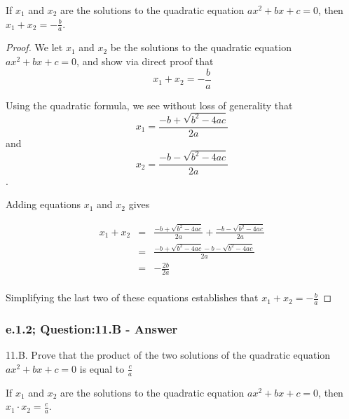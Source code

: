 \begin{tcolorbox}
\begin{theorem}
If $x_1$ and $x_2$ are the solutions to the quadratic equation $ax^2 + bx + c = 0$, then $x_1 + x_2 = - \frac{b}{a}$.
\end{theorem}
\end{tcolorbox}

\begin{proof}

We let $x_1$ and $x_2$ be the solutions to the quadratic equation $ax^2 + bx + c = 0$, and show via direct proof that \[ x_1 + x_2 = -\frac{b}{a} \]

Using the quadratic formula, we see without loss of generality that \[ x_1 = \frac{-b + \sqrt{b^2 -4ac}}{2a} \] and \[ x_2 = \frac{-b - \sqrt{b^2 -4ac}}{2a} \]. 

Adding equations $x_1$ and $x_2$ gives  

\begin{eqnarray*}
x_1 + x_2 & = & \frac{-b + \sqrt{b^2 -4ac}}{2a} + \frac{-b - \sqrt{b^2 -4ac}}{2a}   \nonumber \\
& = & \frac{-b + \sqrt{b^2 -4ac} -b - \sqrt{b^2 -4ac}}{2a} \nonumber \\
& = & - \frac{2b}{2a} \nonumber \\
\end{eqnarray*}

Simplifying the last two of these equations establishes that $x_1 + x_2 = -\frac{b}{a}$
\end{proof}


\subsubsection*{e.1.2; Question:11.B - Answer}
11.B. Prove that the product of the two solutions of the quadratic equation $ax^2 + bx + c = 0$ is equal to $ \frac{c}{a}$ \\

\begin{tcolorbox}
\begin{theorem}
If $x_1$ and $x_2$ are the solutions to the quadratic equation $ax^2 + bx + c = 0$, then $x_1 \cdot x_2 =  \frac{c}{a}$.
\end{theorem}
\end{tcolorbox}

